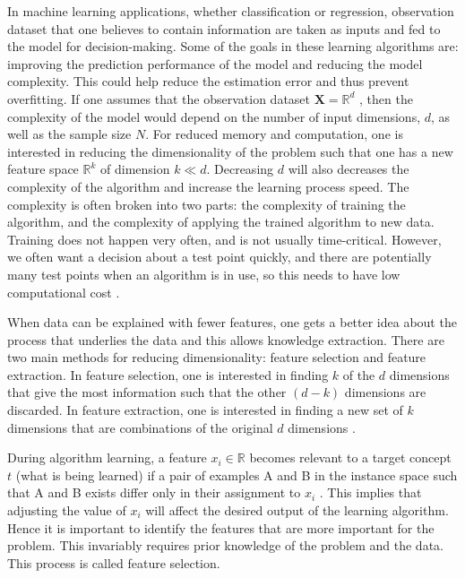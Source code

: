 In machine learning applications, whether classification or regression, observation
dataset that one believes to contain information are taken as inputs and fed
to the model for decision-making. Some of the goals in these learning algorithms are: improving the prediction performance of the model and reducing the model complexity. This could help reduce the estimation error and thus prevent overfitting. If one assumes that the observation dataset $\textbf{X}=\mathbb{R}^d$ \citep{shalev2014understanding}, then the complexity of the model would depend on the number of
input dimensions, $d$, as well as the sample size $N$. 
For reduced memory and computation, one is interested in reducing
the dimensionality of the problem such that one has a new feature space $\mathbb{R}^k$ of dimension $k \ll d $. Decreasing $d$ will also decreases the complexity of the algorithm and increase the learning process speed. The
complexity is often broken into two parts: the complexity of training the algorithm, and the complexity of applying the trained algorithm to new data. Training does not happen very often, and is not usually time-critical. However, we often want a decision about a test point quickly, and there are potentially many test points when an algorithm is in use, so this needs to have low computational cost \citep{marsland2015machine}.

When data can be explained with fewer features, one gets a better idea about the process that underlies the data and this allows knowledge extraction. There are two main methods for reducing dimensionality: feature selection and feature extraction. In feature selection, one is interested in
finding $k$ of the $d$ dimensions that give the most information such that the other $(d - k)$ dimensions are discarded. In feature extraction, one is interested in finding a new set of $k$ dimensions that are combinations of the original $d$ dimensions \citep{alpaydin2014introduction}.
 
During algorithm learning, a feature $x_i\in\mathbb{R}$ becomes relevant to a target concept $t$ (what is being learned) if  a pair of examples A and B in the instance space such that A and B exists differ only in their assignment to  $x_i$ \citep{blum1997selection}. This implies that adjusting the value of $x_i$  will affect the desired output of the learning algorithm. Hence it is important to identify the features that are more important for the problem. This invariably requires prior knowledge of the problem and the data. This process is called feature selection.


